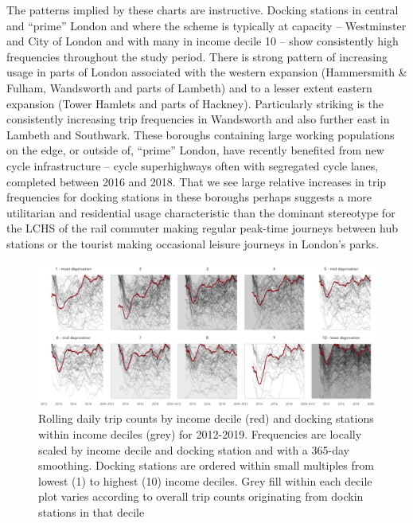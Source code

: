\documentclass[]{article}
\begin{document}
The patterns implied by these charts are instructive. Docking stations in central and ``prime'' London and where the scheme is typically at capacity -- Westminster and City of London and with many in income decile 10 -- show consistently high frequencies throughout the study period. There is strong pattern of increasing usage in parts of London associated with the western expansion (Hammersmith \& Fulham, Wandsworth and parts of Lambeth) and to a lesser extent eastern expansion (Tower Hamlets and parts of Hackney). Particularly striking is the consistently increasing trip frequencies in Wandsworth and also further east in Lambeth and Southwark. These boroughs containing large working populations on the edge, or outside of, ``prime'' London, have recently benefited from new cycle infrastructure -- cycle superhighways often with segregated cycle lanes, completed between 2016 and 2018. That we see large relative increases in trip frequencies for docking stations in these boroughs perhaps suggests a more utilitarian and residential usage characteristic than the dominant stereotype for the LCHS of the rail commuter making regular peak-time journeys between hub stations or the tourist making occasional leisure journeys in London's parks.

\begin{figure}

{\centering \includegraphics[width=1\linewidth]{figures/daily_hires_station_imd_minor} 

}

\caption{Rolling daily trip counts by income decile (red) and docking stations within income deciles (grey) for 2012-2019. Frequencies are locally scaled by income decile and docking station and with a 365-day smoothing. Docking stations are ordered within small multiples from lowest (1) to highest (10) income deciles. Grey fill within each decile plot varies according to overall trip counts originating from dockin stations in that decile}\label{fig:change-time-income}
\end{figure}
\end{document}

